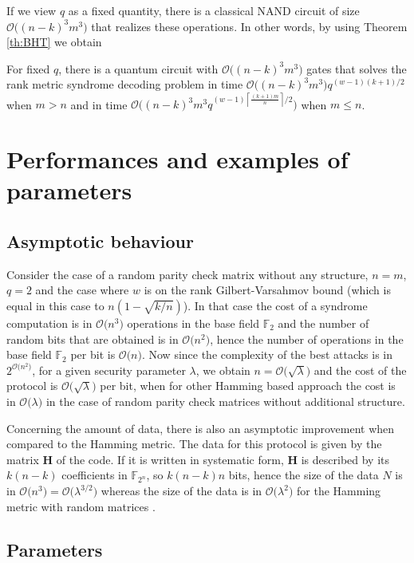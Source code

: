 \documentclass[11pt, a4paper]{llncs}
\newcommand{\Ceil}[1]{\left\lceil #1 \right\rceil}
\newcommand{\F}{\mathbb{F}_2}
\newcommand{\Fn}{\mathbb{F}_{2^n}}
\newcommand{\OO}[1]{\mathcal{O}\big( #1 \big)}
\newcommand{\word}[1]{\ensuremath{\boldsymbol{#1}}}
\newcommand{\Hv}{\word{H}}
\begin{document}
  If we view $q$ as a fixed quantity, there is a 
classical NAND circuit of size $\OO{(n-k)^3m^3}$ that realizes these operations. In other words, by using Theorem
\ref{th:BHT} we obtain 
\begin{proposition}
For fixed $q$, there is a quantum circuit with $\OO{(n-k)^3m^3}$ gates that solves 
the rank metric syndrome decoding problem in time $\OO{(n-k)^3m^3}q^{(w-1)(k+1)/2}$ when 
$m > n$ and in time $\OO{(n-k)^3m^3q^{(w-1)\Ceil{\frac{(k+1)m}{n}}/2}}$ when 
$m  \leq n$.
\end{proposition}

 
\section{Performances and examples of parameters}

\subsection{Asymptotic behaviour}
Consider the case of a random parity check matrix without any structure,
$n=m$, $q=2$ 
and the case where $w$ is on the rank Gilbert-Varsahmov
bound (which is equal in this case to $n (1-\sqrt{k/n})$). In that case the cost of a syndrome
computation is in $\OO{n^3}$ operations in the base field $\F$
and the number of random bits that are obtained is in 
$\OO{n^2}$, hence the number of operations  in the base field $\F$ per bit is
$\OO{n}$. Now since the complexity of the best attacks is in $2^{\OO{n^2}}$,
for a given security parameter $\lambda$, we obtain $n=\OO{\sqrt{\lambda}}$
and the cost of the protocol is $\OO{\sqrt{\lambda}}$ per bit,
when for other Hamming based approach the cost is in $\OO{\lambda}$
in the case of random parity check matrices without additional  structure.

Concerning the amount of data, there is also an asymptotic improvement when compared to the Hamming metric. The data for this protocol is given by the matrix $\Hv$ of the code. If it is written in systematic form, $\Hv$ is described by its $k(n-k)$ coefficients in $\Fn$, so $k(n-k)n$ bits, hence the size of the data $N$ is in  $\OO{n^3} = \OO{\lambda^{3/2}}$ whereas the size of the data is in $\OO{\lambda^2}$ for the Hamming metric with random matrices \cite{FS86}.  



\subsection{Parameters}
\end{document}

